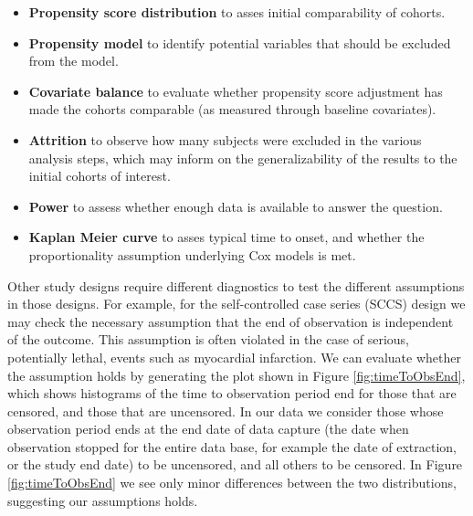 \documentclass[11pt]{book}
\providecommand{\tightlist}{%
  \setlength{\itemsep}{0pt}\setlength{\parskip}{0pt}}
\theoremstyle{definition}
\theoremstyle{definition}
\theoremstyle{definition}
\theoremstyle{remark}
\begin{document}
\begin{itemize}
\tightlist
\item
  \textbf{Propensity score distribution} to asses initial comparability of cohorts.
\item
  \textbf{Propensity model} to identify potential variables that should be excluded from the model.
\item
  \textbf{Covariate balance} to evaluate whether propensity score adjustment has made the cohorts comparable (as measured through baseline covariates).
\item
  \textbf{Attrition} to observe how many subjects were excluded in the various analysis steps, which may inform on the generalizability of the results to the initial cohorts of interest.
\item
  \textbf{Power} to assess whether enough data is available to answer the question.
\item
  \textbf{Kaplan Meier curve} to asses typical time to onset, and whether the proportionality assumption underlying Cox models is met.
\end{itemize}

Other study designs require different diagnostics to test the different assumptions in those designs. For example, for the self-controlled case series (SCCS) design we may check the necessary assumption that the end of observation is independent of the outcome. This assumption is often violated in the case of serious, potentially lethal, events such as myocardial infarction. We can evaluate whether the assumption holds by generating the plot shown in Figure \ref{fig:timeToObsEnd}, which shows histograms of the time to observation period end for those that are censored, and those that are uncensored. In our data we consider those whose observation period ends at the end date of data capture (the date when observation stopped for the entire data base, for example the date of extraction, or the study end date) to be uncensored, and all others to be censored. In Figure \ref{fig:timeToObsEnd} we see only minor differences between the two distributions, suggesting our assumptions holds.
\end{document}
